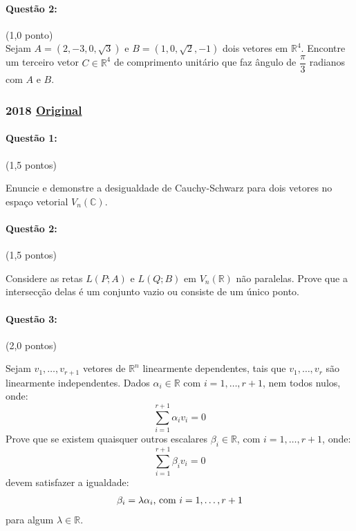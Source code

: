 \documentclass[12pt,a4paper]{article}
\newcommand{\original}[1]{\tiny \href{#1}{Original} \normalsize}
\begin{document}
\paragraph{Questão 2:} (1,0 ponto)\\
Sejam $A = (2, -3, 0, \sqrt{3})$ e $B = (1, 0, \sqrt{2}, -1)$ dois vetores em $\mathbb{R}^4$. Encontre um terceiro vetor $C \in \mathbb{R}^4$ de comprimento unitário que faz ângulo de $\dfrac{\pi}{3}$ radianos com $A$ e $B$.


\newpage

\subsubsection{2018 \original{}}

\paragraph{Questão 1:} (1,5 pontos)

Enuncie e demonstre a desigualdade de Cauchy-Schwarz para dois vetores no espaço vetorial $V_n(\mathbb{C})$.

\paragraph{Questão 2:} (1,5 pontos)

Considere as retas $L(P; A)$ e $L(Q; B)$ em $V_n(\mathbb{R})$ não paralelas. Prove que a intersecção delas é um conjunto vazio ou consiste de um único ponto.

\paragraph{Questão 3:} (2,0 pontos)

Sejam $v_1, \dots, v_{r+1}$ vetores de $\mathbb{R}^n$ linearmente dependentes, tais que $v_1, \dots, v_r$ são linearmente independentes. Dados $\alpha_i \in \mathbb{R}$ com $i=1, \dots, r+1$, nem todos nulos, onde: 
\begin{equation*}
    \sum_{i=1}^{r+1} \alpha_i v_i = 0
\end{equation*}
Prove que se existem quaisquer outros escalares $\beta_i \in \mathbb{R}$, com $i = 1, \dots, r+1$, onde:
\begin{equation*}
    \sum_{i=1}^{r+1} \beta_i v_i = 0
\end{equation*}
devem satisfazer a igualdade:
\begin{align*}
    \beta_i = \lambda\alpha_i \textnormal{, com $i = 1, \dots, r+1$}
\end{align*}
para algum $\lambda \in \mathbb{R}$.
\end{document}
